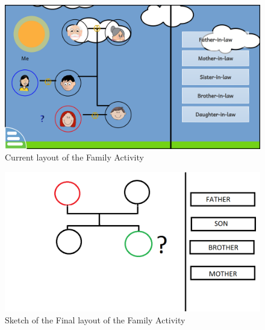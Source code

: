 \documentclass[preprint,12pt]{elsarticle}
\begin{document}
\begin{figure}[H]
\centering\includegraphics[width=1.0\linewidth]{family}
\caption{Current layout of the Family Activity}
\end{figure}

\begin{figure}[H]
\centering\includegraphics[width=1.0\linewidth]{family_2}
\caption{Sketch of the Final layout of the Family Activity}
\end{figure}



\end{document}

